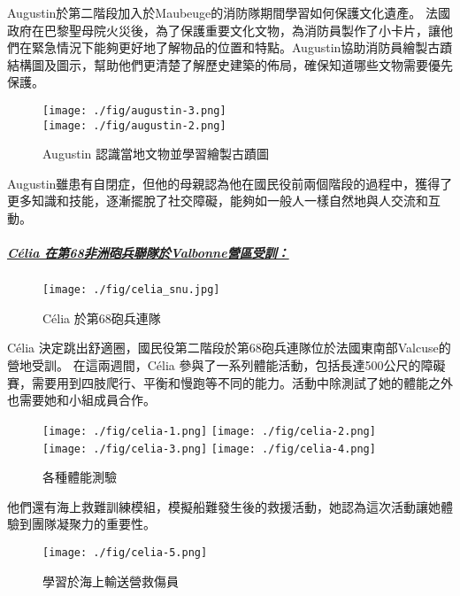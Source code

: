 \documentclass[a4paper,14pt]{extarticle}
\theoremstyle{plain}
\theoremstyle{remark}
\numberwithin{equation}{section}
\begin{document}
Augustin於第二階段加入於Maubeuge的消防隊期間學習如何保護文化遺產。
法國政府在巴黎聖母院火災後，為了保護重要文化文物，為消防員製作了小卡片，讓他們在緊急情況下能夠更好地了解物品的位置和特點。Augustin協助消防員繪製古蹟結構圖及圖示，幫助他們更清楚了解歷史建築的佈局，確保知道哪些文物需要優先保護。

		\begin{figure}[H]
		\centering
		 \texttt{[image: ./fig/augustin-3.png]}
     \\ \vspace{0.1cm}
		 \texttt{[image: ./fig/augustin-2.png]}
    \caption{Augustin 認識當地文物並學習繪製古蹟圖}
		\end{figure}

Augustin雖患有自閉症，但他的母親認為他在國民役前兩個階段的過程中，獲得了更多知識和技能，逐漸擺脫了社交障礙，能夠如一般人一樣自然地與人交流和互動。


    \subparagraph{\href{https://www.youtube.com/watch?v=VbjJIwIVGB4}{Célia 在第68非洲砲兵聯隊於Valbonne營區受訓：}}

    \begin{figure}[H]
		\centering
		\texttt{[image: ./fig/celia\_snu.jpg]}
    \caption{Célia 於第68砲兵連隊}
		\end{figure}

		Célia 決定跳出舒適圈，國民役第二階段於第68砲兵連隊位於法國東南部Valcuse的營地受訓。
在這兩週間，Célia 參與了一系列體能活動，包括長達500公尺的障礙賽，需要用到四肢爬行、平衡和慢跑等不同的能力。活動中除測試了她的體能之外也需要她和小組成員合作。

\begin{figure}[H]
  \centering
  \texttt{[image: ./fig/celia-1.png]}
  \texttt{[image: ./fig/celia-2.png]}
  \\ \vspace{0.1cm}
  \texttt{[image: ./fig/celia-3.png]}
  \texttt{[image: ./fig/celia-4.png]}
  \caption{各種體能測驗}
\end{figure}


他們還有海上救難訓練模組，模擬船難發生後的救援活動，她認為這次活動讓她體驗到團隊凝聚力的重要性。

\begin{figure}[H]
  \centering
  \texttt{[image: ./fig/celia-5.png]}
  \caption{學習於海上輸送營救傷員}
\end{figure}
\end{document}

